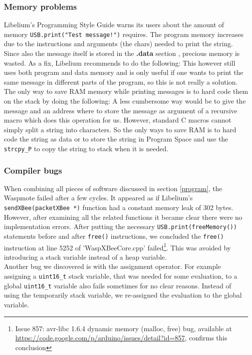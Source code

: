 \subsubsection{Memory problems}
Libelium's Programming Style Guide warns its users about the amount of memory \verb+USB.print("Test message!")+ requires. The program memory increases due to the instructions and arguments (the chars) needed to print the string. Since also the message itself is stored in the \textbf{.data} section , precious memory is wasted. As a fix, Libelium recommends to do the following:
This however still uses both program and data memory and is only useful if one wants to print the same message in different parts of the program, so this is not really a solution. The only way to save RAM memory while printing messages is to hard code them on the stack by doing the following:
A less cumbersome way would be to give the message and an address where to store the message as argument of a recursive macro which does this operation for us. However, standard C macros cannot simply split a string into characters. So the only ways to save RAM is to hard code the string as data or to store the string in Program Space and use the \verb+strcpy_P+ to copy the string to stack when it is needed. 
\subsubsection{Compiler bugs}
When combining all pieces of software discussed in section \ref{program}, the Waspmote failed after a few cycles. It appeared as if Libelium's \verb+sendXBee(packetXBee *)+ function had a constant memory leak of 302 bytes. However, after examining all the related functions it became clear there were no implementation errors. After putting the necessary \verb+USB.print(freeMemory())+ statements before and after \verb+free()+ instructions, we concluded the \verb+free()+ instruction at line 5252 of 'WaspXBeeCore.cpp' failed\footnote{Issue 857: avr-libc 1.6.4 dynamic memory (malloc, free) bug, available at \url{https://code.google.com/p/arduino/issues/detail?id=857}, confirms this conclusion}. This was avoided by introducing a stack variable instead of a heap variable.\\
Another bug we discovered is with the assignment operator. For example assigning a \verb+uint16_t+ stack variable, that was needed for some evaluation, to a global \verb+uint16_t+ variable also fails sometimes for no clear reasons. Instead of using the temporarily stack variable, we re-assigned the evaluation to the global variable.    

